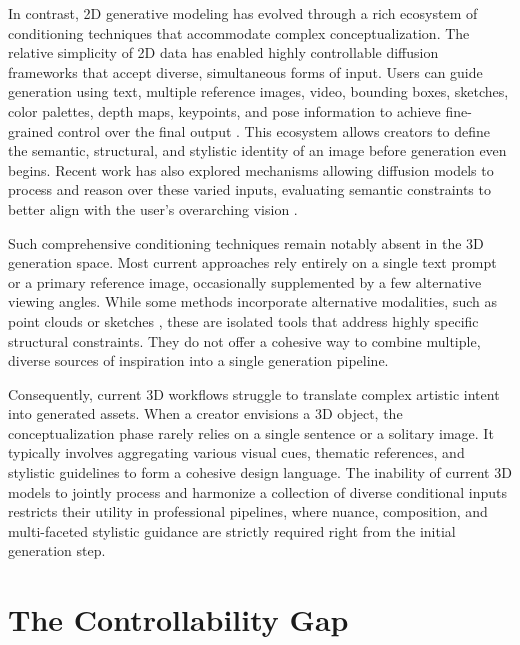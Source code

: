 In contrast, 2D generative modeling has evolved through a rich ecosystem of conditioning techniques that accommodate complex conceptualization. The relative simplicity of 2D data has enabled highly controllable diffusion frameworks that accept diverse, simultaneous forms of input. Users can guide generation using text, multiple reference images, video, bounding boxes, sketches, color palettes, depth maps, keypoints, and pose information to achieve fine-grained control over the final output \cite{Kim_2026, shi2025brickifyenablingexpressivedesign, zhang2023addingconditionalcontroltexttoimage}. This ecosystem allows creators to define the semantic, structural, and stylistic identity of an image before generation even begins. Recent work has also explored mechanisms allowing diffusion models to process and reason over these varied inputs, evaluating semantic constraints to better align with the user's overarching vision \cite{mi2025ithinkidiffuse}.

Such comprehensive conditioning techniques remain notably absent in the 3D generation space. Most current approaches rely entirely on a single text prompt or a primary reference image, occasionally supplemented by a few alternative viewing angles. While some methods incorporate alternative modalities, such as point clouds \cite{zhang20233dshape2vecset3dshaperepresentation} or sketches \cite{chen2023control3dcontrollabletextto3dgeneration}, these are isolated tools that address highly specific structural constraints. They do not offer a cohesive way to combine multiple, diverse sources of inspiration into a single generation pipeline.

Consequently, current 3D workflows struggle to translate complex artistic intent into generated assets. When a creator envisions a 3D object, the conceptualization phase rarely relies on a single sentence or a solitary image. It typically involves aggregating various visual cues, thematic references, and stylistic guidelines to form a cohesive design language. The inability of current 3D models to jointly process and harmonize a collection of diverse conditional inputs restricts their utility in professional pipelines, where nuance, composition, and multi-faceted stylistic guidance are strictly required right from the initial generation step.

\section{The Controllability Gap}

